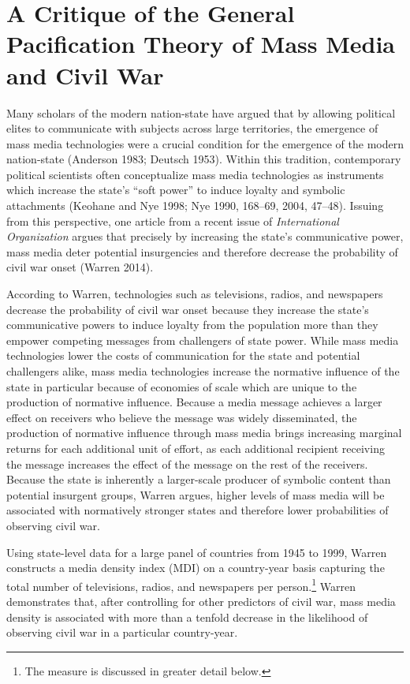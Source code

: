 \documentclass[11pt,article,oneside]{memoir}
\begin{document}
\section{A Critique of the General Pacification Theory of Mass Media and
Civil
War}\label{a-critique-of-the-general-pacification-theory-of-mass-media-and-civil-war}

Many scholars of the modern nation-state have argued that by allowing
political elites to communicate with subjects across large territories,
the emergence of mass media technologies were a crucial condition for
the emergence of the modern nation-state (Anderson 1983; Deutsch 1953).
Within this tradition, contemporary political scientists often
conceptualize mass media technologies as instruments which increase the
state's ``soft power'' to induce loyalty and symbolic attachments
(Keohane and Nye 1998; Nye 1990, 168--69, 2004, 47--48). Issuing from
this perspective, one article from a recent issue of \emph{International
Organization} argues that precisely by increasing the state's
communicative power, mass media deter potential insurgencies and
therefore decrease the probability of civil war onset (Warren 2014).

According to Warren, technologies such as televisions, radios, and
newspapers decrease the probability of civil war onset because they
increase the state's communicative powers to induce loyalty from the
population more than they empower competing messages from challengers of
state power. While mass media technologies lower the costs of
communication for the state and potential challengers alike, mass media
technologies increase the normative influence of the state in particular
because of economies of scale which are unique to the production of
normative influence. Because a media message achieves a larger effect on
receivers who believe the message was widely disseminated, the
production of normative influence through mass media brings increasing
marginal returns for each additional unit of effort, as each additional
recipient receiving the message increases the effect of the message on
the rest of the receivers. Because the state is inherently a
larger-scale producer of symbolic content than potential insurgent
groups, Warren argues, higher levels of mass media will be associated
with normatively stronger states and therefore lower probabilities of
observing civil war.

Using state-level data for a large panel of countries from 1945 to 1999,
Warren constructs a media density index (MDI) on a country-year basis
capturing the total number of televisions, radios, and newspapers per
person.\footnote{The measure is discussed in greater detail below.}
Warren demonstrates that, after controlling for other predictors of
civil war, mass media density is associated with more than a tenfold
decrease in the likelihood of observing civil war in a particular
country-year.
\end{document}
